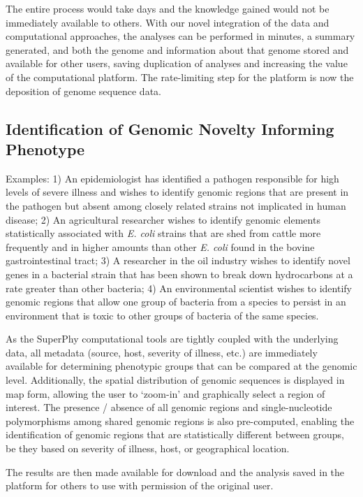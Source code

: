 \documentclass[a4paper,twoside]{article}
\begin{document}
The entire process would take days and the knowledge gained would not be immediately available to others. With our novel integration of the data and computational approaches, the analyses can be performed in minutes, a summary generated, and both the genome and
information about that genome stored and available for other users, saving duplication of analyses and increasing the value of the computational platform. The rate-limiting step for the platform is now the deposition of genome sequence data.

\subsection{Identification of Genomic Novelty Informing Phenotype}
Examples: 1) An epidemiologist has identified a pathogen responsible for high levels of severe illness and wishes to identify genomic regions that are present in the pathogen but absent among closely related strains not implicated in human disease; 2) An agricultural researcher wishes to identify genomic elements statistically associated with \textit{E. coli} strains that are shed from cattle more frequently and in higher amounts than other \textit{E. coli} found in the bovine gastrointestinal tract; 3) A researcher in the oil industry wishes to identify novel genes in a bacterial strain that has been shown to break down hydrocarbons at a rate greater than other bacteria; 4) An environmental scientist wishes to identify genomic regions that allow one group of bacteria from a species to persist in an environment that is toxic to other groups of bacteria of the same species.

As the SuperPhy computational tools are tightly coupled with the underlying data, all metadata (source, host, severity of illness, etc.) are immediately available for determining phenotypic groups that can be compared at the genomic level. Additionally, the spatial distribution of genomic sequences is displayed in map form, allowing the user to `zoom-in' and graphically select a region of interest. The presence / absence of all genomic regions and single-nucleotide polymorphisms among shared genomic regions is also pre-computed, enabling the identification of genomic regions that are statistically different between groups, be they based on severity of illness, host, or geographical location.

The results are then made available for download and the analysis saved in the platform for others to use with permission of the original user.
\end{document}
